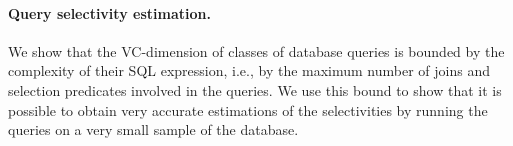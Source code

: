 \paragraph*{Query selectivity estimation.}  We show that the VC-dimension of
classes of database queries is bounded by the complexity of their SQL
expression, i.e., by the maximum number of joins and selection predicates
involved in the queries. We use this bound to show that it is possible to
obtain very accurate estimations of the selectivities by running the queries on
a very small sample of the database. 

%
%
%
%
%
%
%

